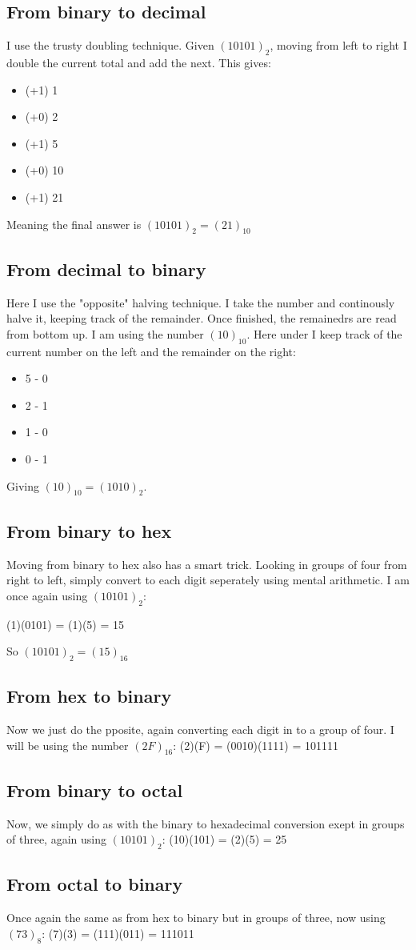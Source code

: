 \documentclass{article}
\begin{document}
\subsection{From binary to decimal}
I use the trusty doubling technique. Given $(10101)_2$, moving from left to right I double the current total and add the next. This gives:
\begin{itemize}
    \item{(+1) 1}
    \item{(+0) 2}
    \item{(+1) 5}
    \item{(+0) 10}
    \item{(+1) 21}
\end{itemize}
Meaning the final answer is $(10101)_2 = (21)_{10}$

\subsection{From decimal to binary}
Here I use the "opposite" halving technique. I take the number and continously halve it, keeping track of the remainder. Once finished, the remainedrs are read from bottom up.
I am using the number $(10)_{10}$. Here under I keep track of the current number on the left and the remainder on the right:
\begin{itemize}
    \item{5 - 0}
    \item{2 - 1}
    \item{1 - 0}
    \item{0 - 1}
\end{itemize}
Giving $(10)_{10} = (1010)_2$.

\subsection{From binary to hex}
Moving from binary to hex also has a smart trick. Looking in groups of four from right to left, simply convert to each digit seperately using mental arithmetic.
I am once again using $(10101)_2$:

(1)(0101) = (1)(5) = 15

So $(10101)_2 = (15)_{16}$

\subsection{From hex to binary}
Now we just do the pposite, again converting each digit in to a group of four. I will be using the number $(2F)_{16}$:
(2)(F) = (0010)(1111) = 101111

\subsection{From binary to octal}
Now, we simply do as with the binary to hexadecimal conversion exept in groups of three, again using $(10101)_2$:
(10)(101) = (2)(5) = 25

\subsection{From octal to binary}
Once again the same as from hex to binary but in groups of three, now using $(73)_8$:
(7)(3) = (111)(011) = 111011
\end{document}
